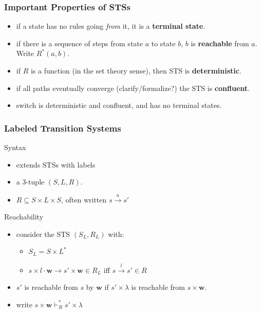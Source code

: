 \documentclass{beamer}
\begin{document}

\begin{frame}
\frametitle{Important Properties of STSs}
\begin{itemize}
\item if a state has no rules going \textit{from} it, it is a \textbf{terminal
    state}.
\item if there is a sequence of steps from state $a$ to state $b$, $b$ is
  \textbf{reachable} from $a$. Write $R^*(a, b)$.
\item if $R$ is a function (in the set theory sense), then STS is \textbf{deterministic}.
\item if all paths eventually converge (clarify/formalize?) the STS is \textbf{confluent}.
\item switch is deterministic and confluent, and has no terminal states.
\end{itemize}
\end{frame}


\begin{frame}
\frametitle{Labeled Transition Systems}
\begin{block}{Syntax}
\begin{itemize}
\item extends STSs with labels
\item a 3-tuple $(S, L, R)$.
\item $R \subseteq S \times L \times S$, often written $s \xrightarrow{a} s'$
\end{itemize}
\end{block}
\begin{block}{Reachability}
\begin{itemize}
\item consider the STS $(S_L, R_L)$ with:
  \begin{itemize}
  \item $S_L = S \times L^*$
  \item $s \times l \cdot \mathbf{w} \rightarrow s' \times \mathbf{w} \in R_L$
    iff $s \xrightarrow{l} s' \in R$ 
   \end{itemize}
\item $s'$ is reachable from $s$ by $\mathbf{w}$ if $s' \times \lambda$ is
      reachable from $s \times \mathbf{w}$.
    \item write $s \times \mathbf{w} \vdash_{R}^* s' \times \lambda$
\end{itemize}
\end{block}
\end{frame}
\end{document}
